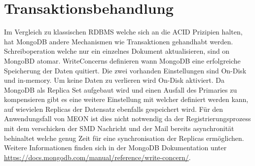 \section{Transaktionsbehandlung}
\label{transactions}
Im Vergleich zu klassischen \Gls{RDBMS} welche sich an die \Gls{ACID} Prizipien halten, hat MongoDB andere Mechanismen wie Transaktionen gehandhabt werden. Schreiboperation welche nur ein einzelnes Dokument aktualisieren, sind on MongoBD atomar. WriteConcerns definieren wann MongoDB eine erfolgreiche Speicherung der Daten quitiert. Die zwei vorhanden Einstellungen sind On-Disk und in-memory. Um keine Daten zu verlieren wird On-Disk aktiviert.\newline
Da MongoDB als Replica Set aufgebaut wird und einen Ausfall des Primaries zu kompensieren gibt es eine weitere Einstellung mit welcher definiert werden kann, auf wievielen Replicas der Datensatz ebenfalls gespeichert wird. Für den Anwendungsfall von MEON ist dies nicht notwendig da der Registrierungsprozess mit dem verschicken der SMD Nachricht und der Mail bereits asynchronität behinaltet welche genug Zeit für eine synchronisation der Replicas ermöglichen. Weitere Informationen finden sich in der MongoDB Dokumentation unter \url{https://docs.mongodb.com/manual/reference/write-concern/}.

